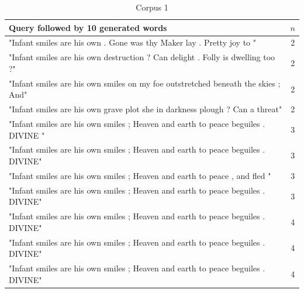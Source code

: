 \documentclass[a4paper,12pt]{article}
\begin{document}
\begin{table}
\begin{tabular}{| l |c|}
\hline
Query followed by 10 generated words & $n$ \\ \hline
"Infant smiles are his own . Gone was thy Maker lay . Pretty joy to " & 2\\ \hline
"Infant smiles are his own destruction ? Can delight . Folly is dwelling too ?"& 2 \\ \hline
"Infant smiles are his own smiles on my foe outstretched beneath the skies ; And" & 2 \\ \hline
"Infant smiles are his own grave plot she in darkness plough ? Can a threat" & 2 \\ \hline

"Infant smiles are his own smiles ; Heaven and earth to peace beguiles . DIVINE " & 3 \\ \hline
"Infant smiles are his own smiles ; Heaven and earth to peace beguiles . DIVINE" & 3 \\ \hline
"Infant smiles are his own smiles ; Heaven and earth to peace , and fled " & 3 \\ \hline
"Infant smiles are his own smiles ; Heaven and earth to peace beguiles . DIVINE" & 3 \\ \hline

"Infant smiles are his own smiles ; Heaven and earth to peace beguiles . DIVINE" & 4 \\ \hline
"Infant smiles are his own smiles ; Heaven and earth to peace beguiles . DIVINE" & 4 \\ \hline
"Infant smiles are his own smiles ; Heaven and earth to peace beguiles . DIVINE" & 4 \\ \hline

\end{tabular}
\caption{ Corpus 1}
\label{tab:corpus1}
\end{table}
\end{document}
